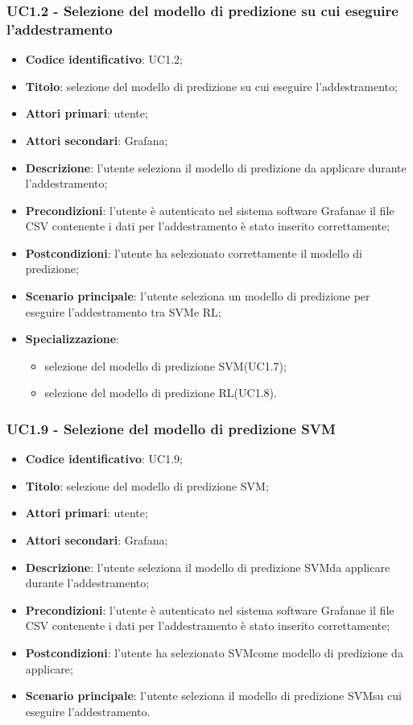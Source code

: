 \subsubsection{UC1.2 - Selezione del modello di predizione su cui eseguire l'addestramento}
\begin{itemize}
	\item \textbf{Codice identificativo}: UC1.2;
	\item \textbf{Titolo}: selezione del modello di predizione su cui eseguire l'addestramento;
	\item \textbf{Attori primari}: utente;
	\item \textbf{Attori secondari}: Grafana\glo;
	\item \textbf{Descrizione}: l'utente seleziona il modello di predizione da applicare durante l'addestramento;
	\item \textbf{Precondizioni}: l'utente è autenticato nel sistema software Grafana\glosp e il file CSV contenente i dati per l'addestramento è stato inserito correttamente;
	\item \textbf{Postcondizioni}: l'utente ha selezionato correttamente il modello di predizione;
	\item \textbf{Scenario principale}: l'utente seleziona un modello di predizione per eseguire l'addestramento tra SVM\glosp e RL\glo;
	\item \textbf{Specializzazione}:
	\begin{itemize}
		\item selezione del modello di predizione SVM\glosp (UC1.7);
		\item selezione del modello di predizione RL\glosp (UC1.8).
	\end{itemize}
\end{itemize}
\subsubsection{UC1.9 - Selezione del modello di predizione SVM}
\begin{itemize}
	\item \textbf{Codice identificativo}: UC1.9;
	\item \textbf{Titolo}: selezione del modello di predizione SVM\glo;
	\item \textbf{Attori primari}: utente;
	\item \textbf{Attori secondari}: Grafana\glo;
	\item \textbf{Descrizione}: l'utente seleziona il modello di predizione SVM\glosp da applicare durante l'addestramento;
	\item \textbf{Precondizioni}: l'utente è autenticato nel sistema software Grafana\glosp e il file CSV contenente i dati per l'addestramento è stato inserito correttamente;
	\item \textbf{Postcondizioni}: l'utente ha selezionato SVM\glosp come modello di predizione da applicare;
	\item \textbf{Scenario principale}: l'utente seleziona il modello di predizione SVM\glosp su cui eseguire l'addestramento.
\end{itemize}
